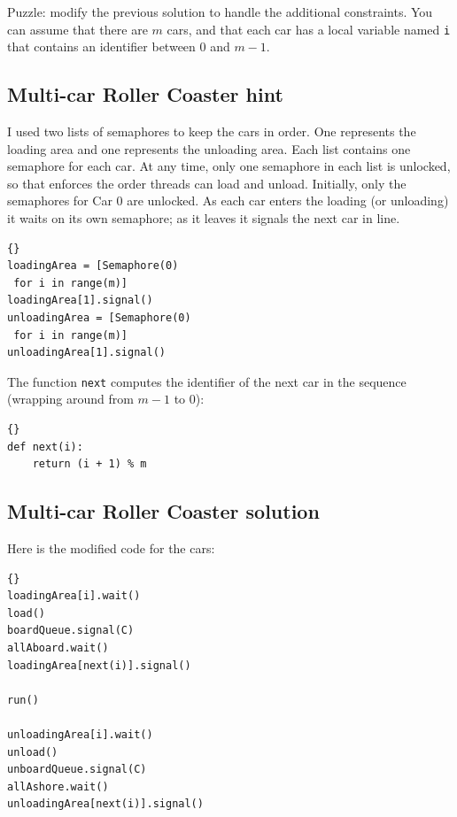 \documentclass{book}
\begin{document}
Puzzle: modify
the previous solution to handle the additional constraints.
You can assume that there are $m$ cars, and that
each car has a local variable named {\tt i}
that contains an identifier between 0 and $m-1$.



\subsection{Multi-car Roller Coaster hint}

I used two lists of semaphores to keep the cars in order.  One
represents the loading area and one represents the unloading area.
Each list contains one semaphore for each car.
At any time, only one semaphore in each
list is unlocked, so that enforces the order threads can
load and unload.
Initially, only the semaphores for Car 0 are unlocked.
As each car enters the
loading (or unloading) it waits on its own semaphore; as it leaves it
signals the next car in line.

\begin{lstlisting}[title={Multi-car Roller Coaster hint}]{}
loadingArea = [Semaphore(0) 
 for i in range(m)]
loadingArea[1].signal()
unloadingArea = [Semaphore(0) 
 for i in range(m)]
unloadingArea[1].signal()
\end{lstlisting}

The function {\tt next} computes the identifier of the next
car in the sequence (wrapping around from $m-1$ to 0):

\begin{lstlisting}[title={Implementation of {\tt next}}]{}
def next(i):
    return (i + 1) % m
\end{lstlisting}




\subsection{Multi-car Roller Coaster solution}

Here is the modified code for the cars:

\newpage
\begin{lstlisting}[title={Multi-car Roller Coaster solution (car)}]{}
loadingArea[i].wait()
load()
boardQueue.signal(C)
allAboard.wait()
loadingArea[next(i)].signal()

run()

unloadingArea[i].wait()
unload()
unboardQueue.signal(C)
allAshore.wait()
unloadingArea[next(i)].signal()
\end{lstlisting}
\end{document}
